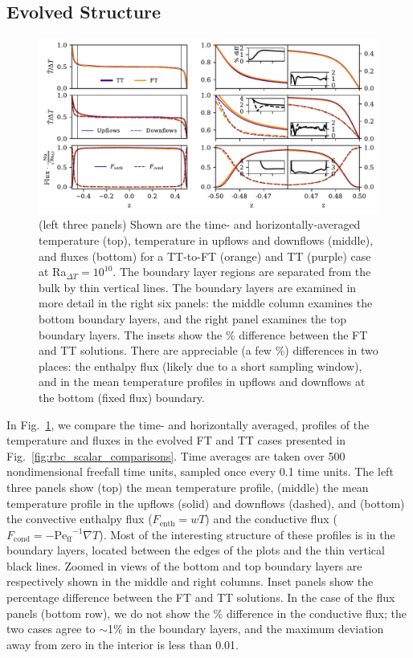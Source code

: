 \documentclass[aps, pre, onecolumn, nofootinbib, notitlepage, groupedaddress, amsfonts, amssymb, amsmath, longbibliography, superscriptaddress]{revtex4-1}
\newcommand{\grad}{\ensuremath{\nabla}}
\newcommand{\Peff}{\ensuremath{\text{Pe}_{\text{ff}}}}
\begin{document}
\subsection{Evolved Structure}
\begin{figure}
\includegraphics[width=\textwidth]{./figs/rbc_1D_profiles.pdf}
\caption{ 
	(left three panels) Shown are the time- and horizontally-averaged temperature (top), temperature in upflows and downflows (middle), and fluxes (bottom) for a TT-to-FT (orange) and TT (purple) case at Ra$_{\Delta T} = 10^{10}$.
	The boundary layer regions are separated from the bulk by thin vertical lines.
	The boundary layers are examined in more detail in the right six panels: the middle column examines the bottom boundary layers, and the right panel examines the top boundary layers.
	The insets show the \% difference between the FT and TT solutions.
	There are appreciable (a few \%) differences in two places: the enthalpy flux (likely due to a short sampling window), and in the mean temperature profiles in upflows and downflows at the bottom (fixed flux) boundary.	
\label{fig:rbc_1D_profiles} }
\end{figure}

In Fig.~\ref{fig:rbc_1D_profiles}, we compare the time- and horizontally averaged, profiles of the temperature and fluxes in the evolved FT and TT cases presented in Fig.~\ref{fig:rbc_scalar_comparisons}.
Time averages are taken over 500 nondimensional freefall time units, sampled once every 0.1 time units.
The left three panels show (top) the mean temperature profile, (middle) the mean temperature profile in the upflows (solid) and downflows (dashed), and (bottom) the convective enthalpy flux ($F_{\text{enth}} = wT$) and the conductive flux ($F_{\text{cond}} = -\Peff^{-1}\grad T$).
Most of the interesting structure of these profiles is in the boundary layers, located between the edges of the plots and the thin vertical black lines.
Zoomed in views of the bottom and top boundary layers are respectively shown in the middle and right columns.
Inset panels show the percentage difference between the FT and TT solutions.
In the case of the flux panels (bottom row), we do not show the \% difference in the conductive flux; the two cases agree to $\sim$1\% in the boundary layers, and the maximum deviation away from zero in the interior is less than 0.01. 
\end{document}
